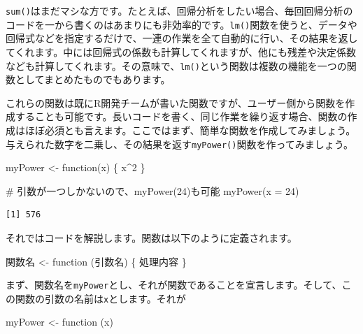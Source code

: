 \documentclass[
  a4paper,
  pandoc,
  ja=standard,
  jafont=haranoaji]{bxjsbook}
\newenvironment{Shaded}{\begin{snugshade}}{\end{snugshade}}
\newcommand{\AttributeTok}[1]{\textcolor[rgb]{0.00,0.48,0.65}{#1}}
\newcommand{\CommentTok}[1]{\textcolor[rgb]{0.37,0.37,0.37}{#1}}
\newcommand{\ControlFlowTok}[1]{\textcolor[rgb]{0.00,0.48,0.65}{#1}}
\newcommand{\DecValTok}[1]{\textcolor[rgb]{0.68,0.00,0.00}{#1}}
\newcommand{\FunctionTok}[1]{\textcolor[rgb]{0.28,0.35,0.67}{#1}}
\newcommand{\NormalTok}[1]{\textcolor[rgb]{0.00,0.48,0.65}{#1}}
\newcommand{\OtherTok}[1]{\textcolor[rgb]{0.00,0.48,0.65}{#1}}
\newcommand{\SpecialCharTok}[1]{\textcolor[rgb]{0.37,0.37,0.37}{#1}}
\begin{document}
\texttt{sum()}はまだマシな方です。たとえば、回帰分析をしたい場合、毎回回帰分析のコードを一から書くのはあまりにも非効率的です。\texttt{lm()}関数を使うと、データや回帰式などを指定するだけで、一連の作業を全て自動的に行い、その結果を返してくれます。中には回帰式の係数も計算してくれますが、他にも残差や決定係数なども計算してくれます。その意味で、\texttt{lm()}という関数は複数の機能を一つの関数としてまとめたものでもあります。

これらの関数は既にR開発チームが書いた関数ですが、ユーザー側から関数を作成することも可能です。長いコードを書く、同じ作業を繰り返す場合、関数の作成はほぼ必須とも言えます。ここではまず、簡単な関数を作成してみましょう。与えられた数字を二乗し、その結果を返す\texttt{myPower()}関数を作ってみましょう。

\begin{Shaded}
\begin{Highlighting}[numbers=left,,]
\NormalTok{myPower }\OtherTok{\textless{}{-}} \ControlFlowTok{function}\NormalTok{(x) \{}
\NormalTok{  x}\SpecialCharTok{\^{}}\DecValTok{2}
\NormalTok{\}}
\end{Highlighting}
\end{Shaded}

\begin{Shaded}
\begin{Highlighting}[numbers=left,,]
\CommentTok{\# 引数が一つしかないので、myPower(24)も可能}
\FunctionTok{myPower}\NormalTok{(}\AttributeTok{x =} \DecValTok{24}\NormalTok{)}
\end{Highlighting}
\end{Shaded}

\begin{verbatim}
[1] 576
\end{verbatim}

それではコードを解説します。関数は以下のように定義されます。

\begin{Shaded}
\begin{Highlighting}[]
\NormalTok{関数名 }\OtherTok{\textless{}{-}} \ControlFlowTok{function}\NormalTok{ (引数名) \{}
\NormalTok{  処理内容}
\NormalTok{\}}
\end{Highlighting}
\end{Shaded}

まず、関数名を\texttt{myPower}とし、それが関数であることを宣言します。そして、この関数の引数の名前は\texttt{x}とします。それが

\begin{Shaded}
\begin{Highlighting}[]
\NormalTok{myPower }\OtherTok{\textless{}{-}} \ControlFlowTok{function}\NormalTok{ (x)}
\end{Highlighting}
\end{Shaded}
\end{document}
